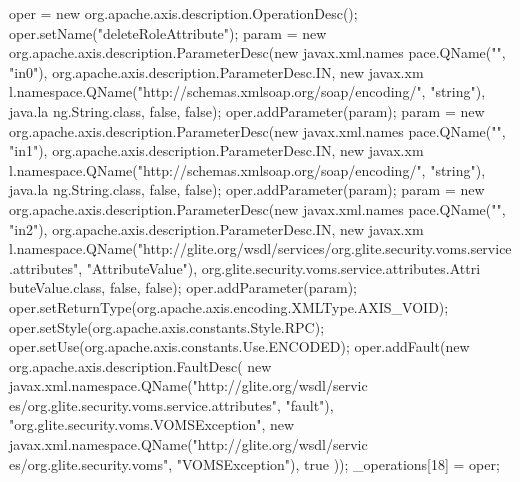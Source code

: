 \begin{DoxyCode}
{        oper = new org.apache.axis.description.OperationDesc();
        oper.setName("deleteRoleAttribute");
        param = new org.apache.axis.description.ParameterDesc(new javax.xml.names
      pace.QName("", "in0"), org.apache.axis.description.ParameterDesc.IN, new javax.xm
      l.namespace.QName("http://schemas.xmlsoap.org/soap/encoding/", "string"), java.la
      ng.String.class, false, false);
        oper.addParameter(param);
        param = new org.apache.axis.description.ParameterDesc(new javax.xml.names
      pace.QName("", "in1"), org.apache.axis.description.ParameterDesc.IN, new javax.xm
      l.namespace.QName("http://schemas.xmlsoap.org/soap/encoding/", "string"), java.la
      ng.String.class, false, false);
        oper.addParameter(param);
        param = new org.apache.axis.description.ParameterDesc(new javax.xml.names
      pace.QName("", "in2"), org.apache.axis.description.ParameterDesc.IN, new javax.xm
      l.namespace.QName("http://glite.org/wsdl/services/org.glite.security.voms.service
      .attributes", "AttributeValue"), org.glite.security.voms.service.attributes.Attri
      buteValue.class, false, false);
        oper.addParameter(param);
        oper.setReturnType(org.apache.axis.encoding.XMLType.AXIS_VOID);
        oper.setStyle(org.apache.axis.constants.Style.RPC);
        oper.setUse(org.apache.axis.constants.Use.ENCODED);
        oper.addFault(new org.apache.axis.description.FaultDesc(
                      new javax.xml.namespace.QName("http://glite.org/wsdl/servic
      es/org.glite.security.voms.service.attributes", "fault"),
                      "org.glite.security.voms.VOMSException",
                      new javax.xml.namespace.QName("http://glite.org/wsdl/servic
      es/org.glite.security.voms", "VOMSException"), 
                      true
                     ));
        _operations[18] = oper;

}
\end{DoxyCode}
